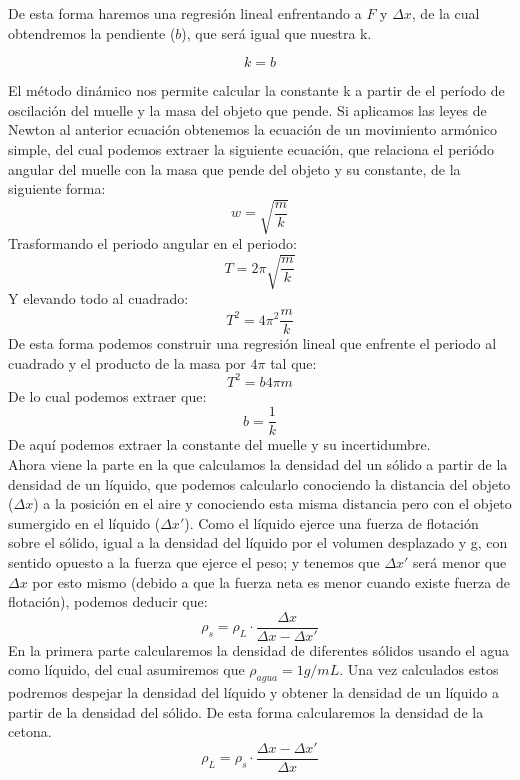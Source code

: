 \documentclass[12pt,a4paper]{book}
\begin{document}
De esta forma haremos una regresión lineal enfrentando a $F$ y $\Delta x$, de la cual obtendremos la pendiente ($b$), que será igual que nuestra k. 

\begin{equation}
k=b \label{Ec: muelle constante del muelle metodo estático}
\end{equation}

El método dinámico nos permite calcular la constante k a partir de el período de oscilación del muelle y la masa del objeto que pende. Si aplicamos las leyes de Newton al anterior ecuación obtenemos la ecuación de un movimiento armónico simple, del cual podemos extraer la siguiente ecuación, que relaciona el periódo angular del muelle con la masa que pende del objeto y su constante, de la siguiente forma:
$$ w=\sqrt{\dfrac{m}{k}}$$
Trasformando el periodo angular en el periodo:
\begin{equation}
T=2\pi \sqrt{\dfrac{m}{k}}
\label{Ec: muelle período realcionado con k muelle}
\end{equation}
Y elevando todo al cuadrado:
\begin{equation}
T^2=4 \pi^2 \dfrac{m}{k}
\label{Ec: muelle periodo al cuadrado relacionado con k muelle}
\end{equation}
De esta forma podemos construir una regresión lineal que enfrente el periodo al cuadrado y el producto de la masa por $4\pi$ tal que:
$$ T^2=b 4\pi m$$
De lo cual podemos extraer que:
\begin{equation}
b=\dfrac{1}{k}
\label{Ec: muelle b realacionado con k muelle}
\end{equation}
De aquí podemos extraer la constante del muelle y su incertidumbre. \\

Ahora viene la parte en la que calculamos la densidad del un sólido a partir de la densidad de un líquido, que podemos calcularlo conociendo la distancia del objeto ($\Delta x$) a la posición en el aire y conociendo esta misma distancia pero con el objeto sumergido en el líquido ($\Delta x'$). Como el líquido ejerce una fuerza de flotación sobre el sólido, igual a la densidad del líquido por el volumen desplazado y g, con sentido opuesto a la fuerza que ejerce el peso; y tenemos que $\Delta x'$ será menor que $\Delta x$ por esto mismo (debido a que la fuerza neta es menor cuando existe fuerza de flotación), podemos deducir que:
\begin{equation}
\rho_s=\rho_L \cdot \dfrac{\Delta x}{\Delta x - \Delta x'}
\label{Ec: muelle densidad del sólido muelle}
\end{equation}
En la primera parte calcularemos la densidad de diferentes sólidos usando el agua como líquido, del cual asumiremos que $\rho_{agua}=1 g/mL$. Una vez calculados estos podremos despejar la densidad del líquido y obtener la densidad de un líquido a partir de la densidad del sólido. De esta forma calcularemos la densidad de la cetona.
\begin{equation}
\rho_L=\rho_s \cdot \dfrac{\Delta x - \Delta x'}{\Delta x}
\label{Ec: muelle densidad del líquido muelle}
\end{equation}
\end{document}
